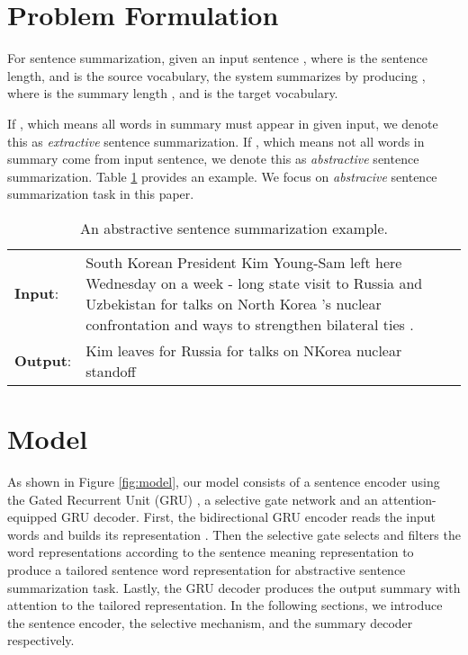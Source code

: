 \documentclass[11pt,a4paper]{article}
\begin{document}
\section{Problem Formulation}
\label{sec:form}


For sentence summarization, given an input sentence , where  is the sentence length,  and   is the source vocabulary, the system summarizes  by producing , where  is the summary length ,  and  is the target vocabulary.

If , which means all words in summary  must appear in given input, we denote this as \textit{extractive} sentence summarization.
If , which means not all words in summary come from input sentence, we denote this as \textit{abstractive} sentence summarization. Table \ref{probDefTable} provides an example.
We focus on \textit{abstracive} sentence summarization task in this paper.

\begin{table}[htbp]
	\begin{center}
		\small
		\setlength\extrarowheight{2pt}
		\begin{tabular}{|lp{}|}
			\hline
			\textbf{Input}: & South Korean President Kim Young-Sam left here Wednesday on a week - long state visit to Russia and Uzbekistan for talks on North Korea 's nuclear confrontation and ways to strengthen bilateral ties .\\
			\textbf{Output}: & Kim leaves for Russia for talks on NKorea nuclear standoff \\
			\hline
		\end{tabular}
	\end{center}
	\caption{\label{probDefTable} An abstractive sentence summarization example.}
\end{table}

 
\section{Model}
\label{sec:model}

As shown in Figure \ref{fig:model}, our model consists of a sentence encoder using the Gated Recurrent Unit (GRU) \cite{cho-EtAl:2014:EMNLP2014}, a selective gate network and an attention-equipped GRU decoder.
First, the bidirectional GRU encoder reads the input words  and builds its representation .
Then the selective gate selects and filters the word representations according to the sentence meaning representation to produce a tailored sentence word representation for abstractive sentence summarization task.
Lastly, the GRU decoder produces the output summary with attention to the tailored representation.
In the following sections, we introduce the sentence encoder, the selective mechanism, and the summary decoder respectively.
\end{document}
